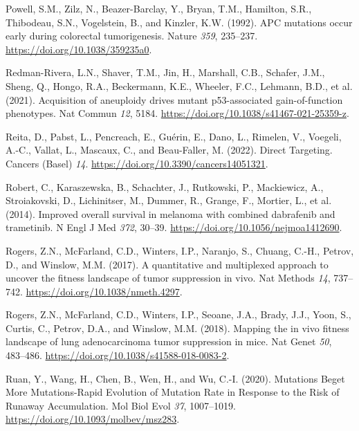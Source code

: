 \begin{CSLReferences}{0}{0}
\leavevmode{}%
Powell, S.M., Zilz, N., Beazer-Barclay, Y., Bryan, T.M., Hamilton, S.R., Thibodeau, S.N., Vogelstein, B., and Kinzler, K.W. (1992). APC mutations occur early during colorectal tumorigenesis. Nature \emph{359}, 235--237. \url{https://doi.org/10.1038/359235a0}.

\leavevmode{}%
Redman-Rivera, L.N., Shaver, T.M., Jin, H., Marshall, C.B., Schafer, J.M., Sheng, Q., Hongo, R.A., Beckermann, K.E., Wheeler, F.C., Lehmann, B.D., et al. (2021). Acquisition of aneuploidy drives mutant p53-associated gain-of-function phenotypes. Nat Commun \emph{12}, 5184. \url{https://doi.org/10.1038/s41467-021-25359-z}.

\leavevmode{}%
Reita, D., Pabst, L., Pencreach, E., Guérin, E., Dano, L., Rimelen, V., Voegeli, A.-C., Vallat, L., Mascaux, C., and Beau-Faller, M. (2022). Direct Targeting. Cancers (Basel) \emph{14}. \url{https://doi.org/10.3390/cancers14051321}.

\leavevmode{}%
Robert, C., Karaszewska, B., Schachter, J., Rutkowski, P., Mackiewicz, A., Stroiakovski, D., Lichinitser, M., Dummer, R., Grange, F., Mortier, L., et al. (2014). Improved overall survival in melanoma with combined dabrafenib and trametinib. N Engl J Med \emph{372}, 30--39. \url{https://doi.org/10.1056/nejmoa1412690}.

\leavevmode{}%
Rogers, Z.N., McFarland, C.D., Winters, I.P., Naranjo, S., Chuang, C.-H., Petrov, D., and Winslow, M.M. (2017). A quantitative and multiplexed approach to uncover the fitness landscape of tumor suppression in vivo. Nat Methods \emph{14}, 737--742. \url{https://doi.org/10.1038/nmeth.4297}.

\leavevmode{}%
Rogers, Z.N., McFarland, C.D., Winters, I.P., Seoane, J.A., Brady, J.J., Yoon, S., Curtis, C., Petrov, D.A., and Winslow, M.M. (2018). Mapping the in vivo fitness landscape of lung adenocarcinoma tumor suppression in mice. Nat Genet \emph{50}, 483--486. \url{https://doi.org/10.1038/s41588-018-0083-2}.

\leavevmode{}%
Ruan, Y., Wang, H., Chen, B., Wen, H., and Wu, C.-I. (2020). Mutations Beget More Mutations-Rapid Evolution of Mutation Rate in Response to the Risk of Runaway Accumulation. Mol Biol Evol \emph{37}, 1007--1019. \url{https://doi.org/10.1093/molbev/msz283}.


\end{CSLReferences}

